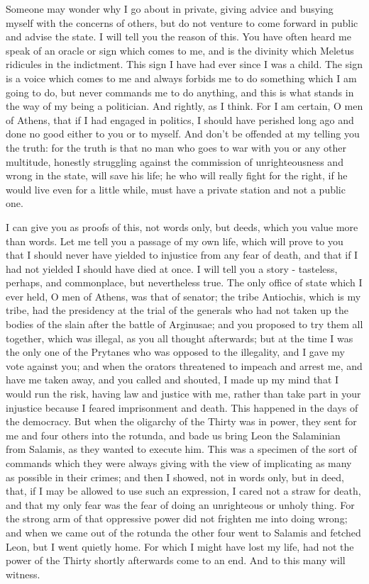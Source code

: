 \documentclass[11pt]{article}
\begin{document}
Someone may wonder why I go about in private, giving advice and busying myself with the concerns of others, but do not venture to come forward in public and advise the state. I will tell you the reason of this. You have often heard me speak of an oracle or sign which comes to me, and is the divinity which Meletus ridicules in the indictment. This sign I have had ever since I was a child. The sign is a voice which comes to me and always forbids me to do something which I am going to do, but never commands me to do anything, and this is what stands in the way of my being a politician. And rightly, as I think. For I am certain, O men of Athens, that if I had engaged in politics, I should have perished long ago and done no good either to you or to myself. And don't be offended at my telling you the truth: for the truth is that no man who goes to war with you or any other multitude, honestly struggling against the commission of unrighteousness and wrong in the state, will save his life; he who will really fight for the right, if he would live even for a little while, must have a private station and not a public one.

I can give you as proofs of this, not words only, but deeds, which you value more than words. Let me tell you a passage of my own life, which will prove to you that I should never have yielded to injustice from any fear of death, and that if I had not yielded I should have died at once. I will tell you a story - tasteless, perhaps, and commonplace, but nevertheless true. The only office of state which I ever held, O men of Athens, was that of senator; the tribe Antiochis, which is my tribe, had the presidency at the trial of the generals who had not taken up the bodies of the slain after the battle of Arginusae; and you proposed to try them all together, which was illegal, as you all thought afterwards; but at the time I was the only one of the Prytanes who was opposed to the illegality, and I gave my vote against you; and when the orators threatened to impeach and arrest me, and have me taken away, and you called and shouted, I made up my mind that I would run the risk, having law and justice with me, rather than take part in your injustice because I feared imprisonment and death. This happened in the days of the democracy. But when the oligarchy of the Thirty was in power, they sent for me and four others into the rotunda, and bade us bring Leon the Salaminian from Salamis, as they wanted to execute him. This was a specimen of the sort of commands which they were always giving with the view of implicating as many as possible in their crimes; and then I showed, not in words only, but in deed, that, if I may be allowed to use such an expression, I cared not a straw for death, and that my only fear was the fear of doing an unrighteous or unholy thing. For the strong arm of that oppressive power did not frighten me into doing wrong; and when we came out of the rotunda the other four went to Salamis and fetched Leon, but I went quietly home. For which I might have lost my life, had not the power of the Thirty shortly afterwards come to an end. And to this many will witness.
\end{document}
